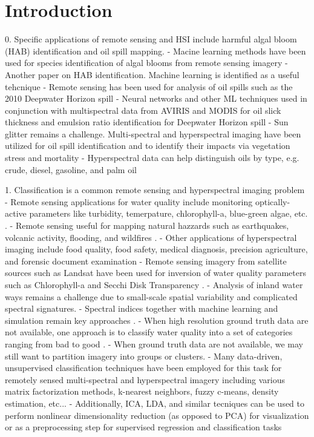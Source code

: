\documentclass[remotesensing,article,submit,pdftex,moreauthors]{Definitions/mdpi}
\begin{document}
\section{Introduction}

0. Specific applications of remote sensing and HSI include harmful algal bloom (HAB) identification and oil spill mapping. 
    - Macine learning methods have been used for species identification of algal blooms from remote sensing imagery \cite{ghatkar2019classification}
    - Another paper on HAB identification. Machine learning is identified as a useful tehcnique \cite{thenkabail2018hyperspectral}
    - Remote sensing has been used for analysis of oil spills such as the 2010 Deepwater Horizon spill \cite{kokaly2013spectroscopic}
    - Neural networks and other ML techniques used in conjunction with multispectral data from AVIRIS and MODIS for oil slick thickness and emulsion ratio identification for Deepwater Horizon spill \cite{leifer2012state}
    - Sun glitter remains a challenge. Multi-spectral and hyperspectral imaging have been utilized for oil spill identification and to identify their impacts via vegetation stress and mortality \cite{fingas2014review, khan2018modern} 
    - Hyperspectral data can help distinguish oils by type, e.g. crude, diesel, gasoline, and palm oil \cite{yang2020characterization}

1. Classification is a common remote sensing and hyperspectral imaging problem
    - Remote sensing applications for water quality include monitoring optically-active parameters like turbidity, temerpature, chlorophyll-a, blue-green algae, etc. \cite{ritchie2003remote}.
    - Remote sensing useful for mapping natural hazzards such as earthquakes, volcanic activity, flooding, and wildfires \cite{joyce2009review}.
    - Other applications of hyperspectral imaging include food quality, food safety, medical diagnosis, precision agriculture, and forensic document examination \cite{khan2018modern}
    - Remote sensing imagery from satellite sources such as Landsat have been used for inversion of water quality parameters such as Chlorophyll-a and Secchi Disk Transparency \cite{bonansea2015using}.
    - Analysis of inland water ways remains a challenge due to small-scale spatial variability and complicated spectral signatures. 
    - Spectral indices together with machine learning and simulation remain key approaches \cite{sagan2020monitoring}.
    - When high resolution ground truth data are not available, one approach is to classify water quality into a set of categories ranging from bad to good \cite{koponen2002lake}.
    - When ground truth data are not available, we may still want to partition imagery into groups or clusters. 
    - Many data-driven, unsupervised classification techniques have been employed for this task for remotely sensed multi-spectral and hyperspectral imagery including various matrix factorization methods, k-nearest neighbors, fuzzy c-means, density estimation, etc... \cite{zhang2019hyperspectral}
    - Additionally, ICA, LDA, and similar tecniques can be used to perform nonlinear dimensionality reduction (as opposed to PCA) for visualization or as a preprocessing step for supervised regression and classification tasks \cite{liang2010hyperspectral, zhangSVM2014}
    
\end{document}

